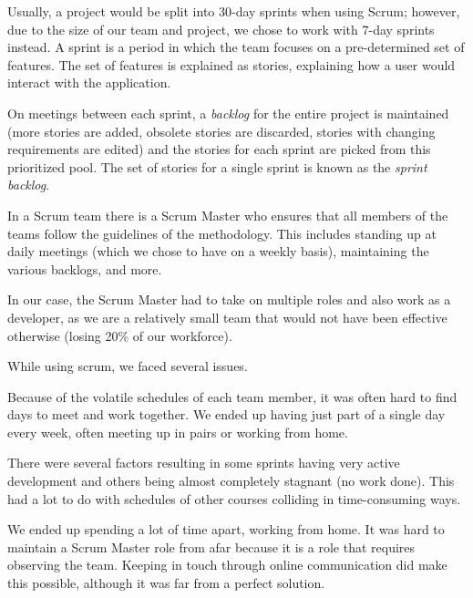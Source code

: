 Usually, a project would be split into 30-day sprints when using Scrum; however, due to the size of
our team and project, we chose to work with 7-day sprints instead. A sprint is a period in which the
team focuses on a pre-determined set of features. The set of features is explained as stories,
explaining how a user would interact with the application.

On meetings between each sprint, a \emph{backlog} for the entire project is maintained (more stories are
added, obsolete stories are discarded, stories with changing requirements are edited) and the stories
for each sprint are picked from this prioritized pool. The set of stories for a single sprint is known
as the \emph{sprint backlog}.

In a Scrum team there is a Scrum Master who ensures that all members of the teams follow the guidelines
of the methodology. This includes standing up at daily meetings (which we chose to have on a weekly basis),
maintaining the various backlogs, and more.

In our case, the Scrum Master had to take on multiple roles and also work as a developer, as we are a relatively
small team that would not have been effective otherwise (losing 20\% of our workforce).

While using scrum, we faced several issues.

Because of the volatile schedules of each team member, it was often hard to find days to meet and work
together. We ended up having just part of a single day every week, often meeting up in pairs or working
from home.

There were several factors resulting in some sprints having very active development and others being almost
completely stagnant (no work done). This had a lot to do with schedules of other courses colliding in
time-consuming ways.

We ended up spending a lot of time apart, working from home. It was hard to maintain a Scrum Master role from
afar because it is a role that requires observing the team. Keeping in touch through online communication did
make this possible, although it was far from a perfect solution.
